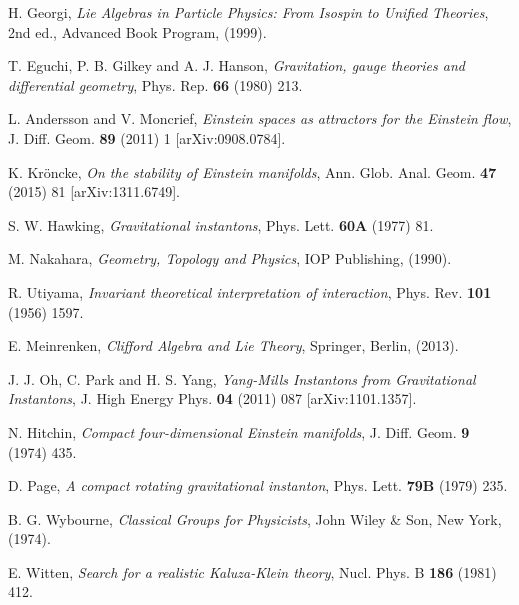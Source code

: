 \documentclass[12pt,epsf]{article}
\begin{document}
\begin{thebibliography}{55}
 H. Georgi, {\it Lie Algebras in Particle Physics: From Isospin to Unified Theories},
2nd ed., Advanced Book Program, (1999).



 T. Eguchi, P. B. Gilkey and A. J. Hanson, {\it Gravitation, gauge theories and
differential geometry}, Phys. Rep. {\bf 66} (1980) 213.



 L. Andersson and V. Moncrief, {\it Einstein spaces as attractors for the Einstein flow},
J. Diff. Geom. {\bf 89} (2011) 1 [arXiv:0908.0784].



 K. Kr\"oncke, {\it On the stability of Einstein manifolds},
Ann. Glob. Anal. Geom. {\bf 47} (2015) 81 [arXiv:1311.6749].



 S. W. Hawking, {\it Gravitational instantons}, Phys. Lett. {\bf 60A} (1977) 81.



 M. Nakahara, {\it Geometry, Topology and Physics}, IOP Publishing, (1990).



 R. Utiyama, {\it Invariant theoretical interpretation of interaction},
Phys. Rev. {\bf 101} (1956) 1597.



 E. Meinrenken, {\it Clifford Algebra and Lie Theory}, Springer, Berlin, (2013).



 J. J. Oh, C. Park and H. S. Yang, {\it Yang-Mills Instantons from Gravitational Instantons},
J. High Energy Phys. {\bf 04} (2011) 087 [arXiv:1101.1357].



 N. Hitchin, {\it Compact four-dimensional Einstein manifolds},
J. Diff. Geom. {\bf 9} (1974) 435.



 D. Page, {\it A compact rotating gravitational instanton},
Phys. Lett. {\bf 79B} (1979) 235.



 B. G. Wybourne, {\it Classical Groups for Physicists}, John Wiley \& Son, New York, (1974).



 E. Witten, {\it Search for a realistic Kaluza-Klein theory}, Nucl. Phys. B {\bf 186} (1981) 412.




\end{thebibliography}
\end{document}

